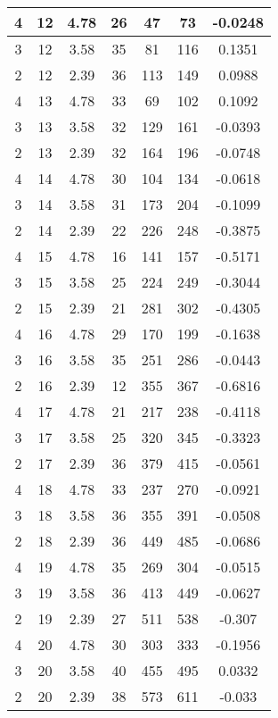 \documentclass[letterpaper, 12pt]{article}
\begin{document}
\begin{longtable}{|c|c|c|c|c|c|c|}
\hline
4 & 12 & 4.78 & 26 & 47 & 73 & -0.0248 \\
\hline
3 & 12 & 3.58 & 35 & 81 & 116 & 0.1351 \\
\hline
2 & 12 & 2.39 & 36 & 113 & 149 & 0.0988 \\
\hline
4 & 13 & 4.78 & 33 & 69 & 102 & 0.1092 \\
\hline
3 & 13 & 3.58 & 32 & 129 & 161 & -0.0393 \\
\hline
2 & 13 & 2.39 & 32 & 164 & 196 & -0.0748 \\
\hline
4 & 14 & 4.78 & 30 & 104 & 134 & -0.0618 \\
\hline
3 & 14 & 3.58 & 31 & 173 & 204 & -0.1099 \\
\hline
2 & 14 & 2.39 & 22 & 226 & 248 & -0.3875 \\
\hline
4 & 15 & 4.78 & 16 & 141 & 157 & -0.5171 \\
\hline
3 & 15 & 3.58 & 25 & 224 & 249 & -0.3044 \\
\hline
2 & 15 & 2.39 & 21 & 281 & 302 & -0.4305 \\
\hline
4 & 16 & 4.78 & 29 & 170 & 199 & -0.1638 \\
\hline
3 & 16 & 3.58 & 35 & 251 & 286 & -0.0443 \\
\hline
2 & 16 & 2.39 & 12 & 355 & 367 & -0.6816 \\
\hline
4 & 17 & 4.78 & 21 & 217 & 238 & -0.4118 \\
\hline
3 & 17 & 3.58 & 25 & 320 & 345 & -0.3323 \\
\hline
2 & 17 & 2.39 & 36 & 379 & 415 & -0.0561 \\
\hline
4 & 18 & 4.78 & 33 & 237 & 270 & -0.0921 \\
\hline
3 & 18 & 3.58 & 36 & 355 & 391 & -0.0508 \\
\hline
2 & 18 & 2.39 & 36 & 449 & 485 & -0.0686 \\
\hline
4 & 19 & 4.78 & 35 & 269 & 304 & -0.0515 \\
\hline
3 & 19 & 3.58 & 36 & 413 & 449 & -0.0627 \\
\hline
2 & 19 & 2.39 & 27 & 511 & 538 & -0.307 \\
\hline
4 & 20 & 4.78 & 30 & 303 & 333 & -0.1956 \\
\hline
3 & 20 & 3.58 & 40 & 455 & 495 & 0.0332 \\
\hline
2 & 20 & 2.39 & 38 & 573 & 611 & -0.033 \\
\hline
\end{longtable}
\end{document}
